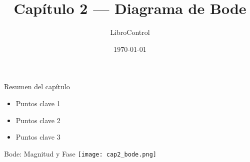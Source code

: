 \documentclass{beamer}
\title{Capítulo 2 — Diagrama de Bode}
\author{LibroControl}
\date{\today}
\begin{document}
\begin{frame}
  \titlepage
\end{frame}

\begin{frame}{Resumen del capítulo}
  \begin{itemize}
    \item Puntos clave 1
    \item Puntos clave 2
    \item Puntos clave 3
  \end{itemize}
\end{frame}

\begin{frame}{Bode: Magnitud y Fase}
  \centering
  \texttt{[image: cap2\_bode.png]}
\end{frame}
\end{document}

